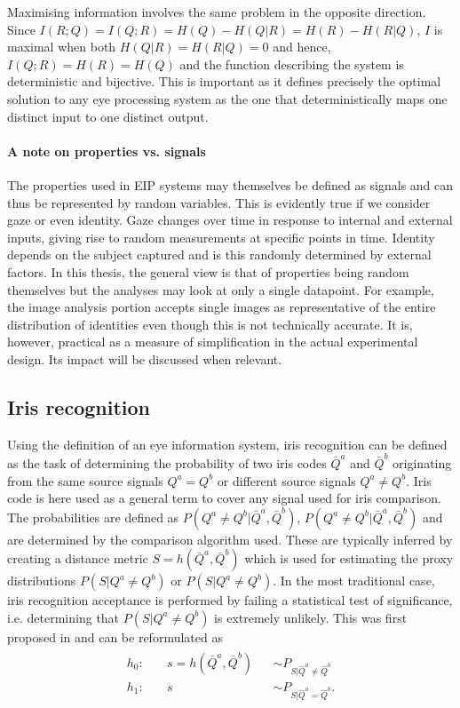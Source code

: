 Maximising information involves the same problem in the opposite direction. Since $I(R;Q) = I(Q; R) = H(Q) - H(Q|R) = H(R) - H(R|Q)$, $I$ is maximal when both $H(Q|R)=H(R|Q)=0$ and hence, $I(Q;R)=H(R)=H(Q)$ and the function describing the system is deterministic and bijective. This is important as it defines precisely the optimal solution to any eye processing system as the one that deterministically maps one distinct input to one distinct output.

\paragraph{A note on properties vs. signals}
The properties used in EIP systems may themselves be defined as signals and can thus be represented by random variables. This is evidently true if we consider gaze or even identity. Gaze changes over time in response to internal and external inputs, giving rise to random measurements at specific points in time. Identity depends on the subject captured and is this randomly determined by external factors. In this thesis, the general view is that of properties being random themselves but the analyses may look at only a single datapoint. For example, the image analysis portion accepts single images as representative of the entire distribution of identities even though this is not technically accurate. It is, however, practical as a measure of simplification in the actual experimental design. Its impact will be discussed when relevant.

\subsection{Iris recognition}\label{sec:iris-goal}
Using the definition of an eye information system, iris recognition can be defined as the task of determining the probability of two iris codes $\bar{Q}^a$ and $\bar{Q}^b$ originating from the same source signals $Q^a = Q^b$ or different source signals $Q^a\neq Q^b$. Iris code is here used as a general term to cover any signal used for iris comparison. The probabilities are defined as $P(Q^a\neq Q^b|\bar{Q}^a, \bar{Q}^b)$, $P(Q^a\neq Q^b|\bar{Q}^a, \bar{Q}^b)$ and are determined by the comparison algorithm used. These are typically inferred by creating a distance metric $S = h(\bar{Q}^a, \bar{Q}^b)$ which is used for estimating the proxy distributions $P(S|Q^a\neq Q^b)$ or $P(S|Q^a\neq Q^b)$. In the most traditional case, iris recognition acceptance is performed by failing a statistical test of significance, i.e. determining that $P(S|Q^a\neq Q^b)$ is extremely unlikely. This was first proposed in \cite{DAUGMAN_IRIS_ORIG} and can be reformulated as
\begin{align}
\begin{aligned}
    h_0: & \quad s = h(\bar{Q}^a, \bar{Q}^b) &&\sim  P_{S|\hat{Q}^a\neq \hat{Q}^b}\\
    h_1: & \quad s && \sim  P_{S|\hat{Q}^a = \hat{Q}^b}.
\end{aligned}
\end{align}

